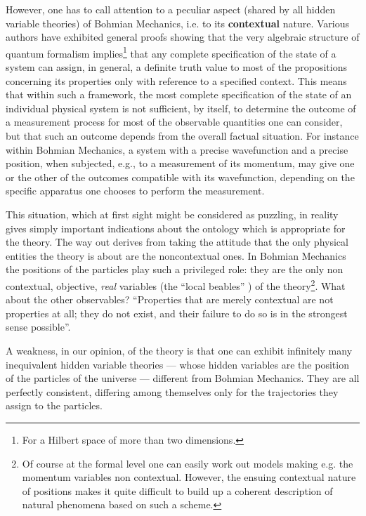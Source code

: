\documentclass[12pt]{article}
\begin{document}
However, one has to call attention to a peculiar aspect (shared by
all hidden variable theories) of Bohmian Mechanics, i.e. to its
{\bf contextual} nature.  Various authors \cite{gl,ks} have
exhibited general proofs showing that the very algebraic structure
of quantum formalism implies\footnote{For a Hilbert space of more
than two dimensions.} that any complete specification of the state
of a system can assign, in general, a definite truth value to most
of the propositions concerning its properties only with reference
to a specified context. This means that within such a framework,
the most complete specification of the state of an individual
physical system is not sufficient, by itself, to determine the
outcome of a measurement process for most of the observable
quantities one can consider, but that such an outcome depends from
the overall factual situation. For instance within Bohmian
Mechanics, a system with a precise wavefunction and a precise
position, when subjected, e.g., to a measurement  of its momentum,
may give one or the other of the outcomes compatible with its
wavefunction, depending on the specific apparatus one chooses to
perform the measurement.

This situation, which at first sight might be considered as
puzzling, in reality  gives simply important indications about the
ontology which is appropriate for the theory. The way out derives
from taking the attitude that the only physical entities the
theory is about are the noncontextual ones. In Bohmian Mechanics
the positions of the particles play such a privileged role: they
are the only non contextual, objective, {\it real} variables (the
``local beables'' \cite{bell1,bell1b}) of the theory\footnote{Of
course at the formal level one can easily work out models making
e.g. the momentum variables non contextual. However, the ensuing
contextual nature of positions makes it quite difficult to build
up a coherent description of natural phenomena based on such a
scheme.}. What about the other observables? \cite{dgz3}
``Properties that are merely contextual are not properties at all;
they do not exist, and their failure to do so is in the strongest
sense possible''.

A weakness, in our opinion, of the theory is that one can exhibit
\cite{dg} infinitely many inequivalent hidden variable theories
--- whose hidden variables are the position of the particles of
the universe --- different from Bohmian Mechanics. They are all
perfectly consistent, differing among themselves only for the
trajectories they assign to the particles.
\end{document}
